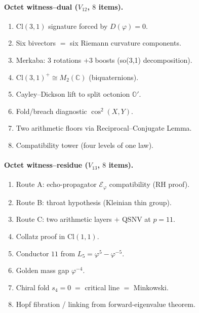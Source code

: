 \documentclass[11pt,a4paper]{article}
\theoremstyle{plain}
\theoremstyle{definition}
\theoremstyle{remark}
\numberwithin{equation}{section}
\providecommand{\Cl}{\mathrm{Cl}}
\providecommand{\C}{\mathbb{C}}
\providecommand{\Os}{\mathbb{O}'}
\providecommand{\vp}{\varphi}
\providecommand{\EF}{\mathcal{E}}
\providecommand{\Lk}{L}
\begin{document}
\paragraph{Octet witness--dual ($V_{12}$, $8$ items).}
\begin{enumerate}[label=\textbf{WD\arabic*.}]
\item $\Cl(3,1)$ signature forced by $D(\vp) = 0$.
\item Six bivectors $=$ six Riemann curvature components.
\item Merkaba: $3$ rotations $+ 3$ boosts (so(3,1) decomposition).
\item $\Cl(3,1)^+ \cong M_2(\C)$ (biquaternions).
\item Cayley--Dickson lift to split octonion $\Os$.
\item Fold/breach diagnostic $\cos^2(X, Y)$.
\item Two arithmetic floors via Reciprocal--Conjugate Lemma.
\item Compatibility tower (four levels of one law).
\end{enumerate}

\paragraph{Octet witness--residue ($V_{13}$, $8$ items).}
\begin{enumerate}[label=\textbf{WR\arabic*.}]
\item Route A: echo-propagator $\EF_\vp$ compatibility (RH proof).
\item Route B: throat hypothesis (Kleinian thin group).
\item Route C: two arithmetic layers $+$ QSNV at $p = 11$.
\item Collatz proof in $\Cl(1,1)$.
\item Conductor $11$ from $\Lk_5 = \vp^5 - \vp^{-5}$.
\item Golden mass gap $\vp^{-4}$.
\item Chiral fold $s_4 = 0 \;=$ critical line $=$ Minkowski.
\item Hopf fibration / linking from forward-eigenvalue theorem.
\end{enumerate}
\end{document}
